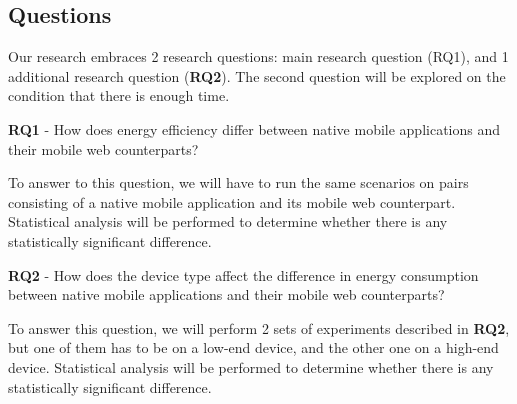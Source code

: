 \subsection{Questions}
Our research embraces 2 research questions:  main research question (RQ1), and 1 additional research question (\textbf{RQ2}). The second question will be explored on the condition that there is enough time.

\textbf{RQ1} - How does energy efficiency differ between native mobile applications and their mobile web counterparts?

To answer to this question, we will have to run the same scenarios on pairs consisting of a native mobile application and its mobile web counterpart. Statistical analysis will be performed to determine whether there is any statistically significant difference.



\textbf{RQ2} - How does the device type affect the difference in energy consumption between native mobile applications and their mobile web counterparts?

To answer this question, we will perform 2 sets of experiments described in \textbf{RQ2}, but one of them has to be on a low-end device, and the other one on a high-end device. Statistical analysis will be performed to determine whether there is any statistically significant difference.


